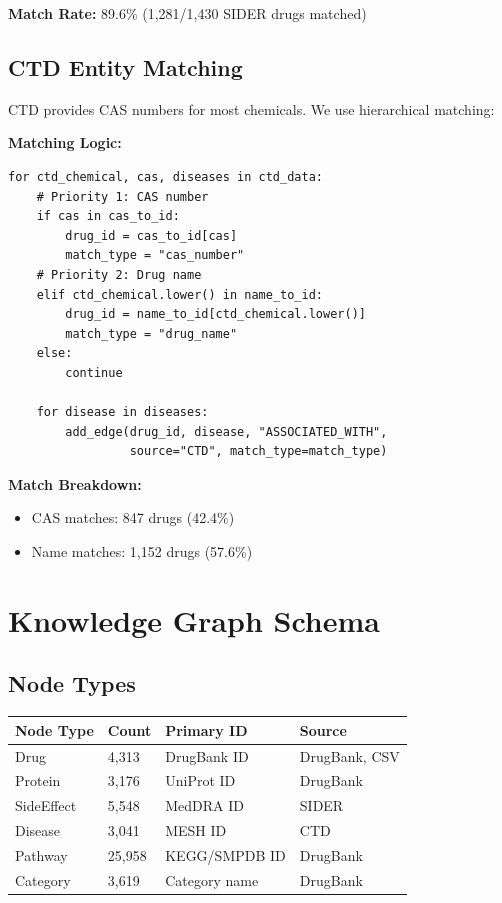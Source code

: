 \documentclass[11pt,a4paper]{article}
\begin{document}
\textbf{Match Rate:} 89.6\% (1,281/1,430 SIDER drugs matched)

\subsection{CTD Entity Matching}

CTD provides CAS numbers for most chemicals. We use hierarchical matching:

\textbf{Matching Logic:}
\begin{verbatim}
for ctd_chemical, cas, diseases in ctd_data:
    # Priority 1: CAS number
    if cas in cas_to_id:
        drug_id = cas_to_id[cas]
        match_type = "cas_number"
    # Priority 2: Drug name
    elif ctd_chemical.lower() in name_to_id:
        drug_id = name_to_id[ctd_chemical.lower()]
        match_type = "drug_name"
    else:
        continue
    
    for disease in diseases:
        add_edge(drug_id, disease, "ASSOCIATED_WITH", 
                 source="CTD", match_type=match_type)
\end{verbatim}

\textbf{Match Breakdown:}
\begin{itemize}
    \item CAS matches: 847 drugs (42.4\%)
    \item Name matches: 1,152 drugs (57.6\%)
\end{itemize}

\newpage
\section{Knowledge Graph Schema}

\subsection{Node Types}

\begin{longtable}{@{}llll@{}}
\toprule
\textbf{Node Type} & \textbf{Count} & \textbf{Primary ID} & \textbf{Source} \\
\midrule
\endhead
Drug & 4,313 & DrugBank ID & DrugBank, CSV \\
Protein & 3,176 & UniProt ID & DrugBank \\
SideEffect & 5,548 & MedDRA ID & SIDER \\
Disease & 3,041 & MESH ID & CTD \\
Pathway & 25,958 & KEGG/SMPDB ID & DrugBank \\
Category & 3,619 & Category name & DrugBank \\
\bottomrule
\end{longtable}
\end{document}
